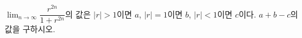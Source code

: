 $\displaystyle\lim_{n\to\infty}\dfrac{r^{2n}}{1+r^{2n}}$의 값은 $|r|>1$이면 $a$, $|r|=1$이면 $b$, $|r|<1$이면 $c$이다. $a+b-c$의 값을 구하시오. 
